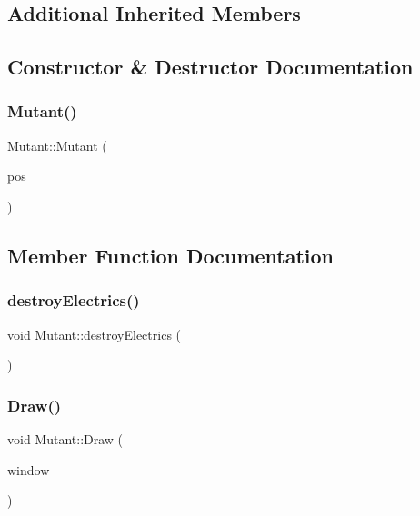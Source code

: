 \subsection*{Additional Inherited Members}


\subsection{Constructor \& Destructor Documentation}
\hypertarget{class_mutant_aa054e45e945caaef4ca7777fa32190c2}{}\label{class_mutant_aa054e45e945caaef4ca7777fa32190c2} 
\subsubsection{\texorpdfstring{Mutant()}{Mutant()}}
{\footnotesize\ttfamily Mutant\+::\+Mutant (\begin{DoxyParamCaption}\item[{\hyperlink{class_vector2_d}{Vector2D}}]{pos }\end{DoxyParamCaption})}



\subsection{Member Function Documentation}
\hypertarget{class_mutant_a5bbd6188efe9a18fa208bdaaf011ccdc}{}\label{class_mutant_a5bbd6188efe9a18fa208bdaaf011ccdc} 
\subsubsection{\texorpdfstring{destroy\+Electrics()}{destroyElectrics()}}
{\footnotesize\ttfamily void Mutant\+::destroy\+Electrics (\begin{DoxyParamCaption}{ }\end{DoxyParamCaption})}

\hypertarget{class_mutant_a024a5caac9b29a79a4a505d36cfd3122}{}\label{class_mutant_a024a5caac9b29a79a4a505d36cfd3122} 
\subsubsection{\texorpdfstring{Draw()}{Draw()}}
{\footnotesize\ttfamily void Mutant\+::\+Draw (\begin{DoxyParamCaption}\item[{sf\+::\+Render\+Window \&}]{window }\end{DoxyParamCaption})\hspace{0.3cm}{\ttfamily [virtual]}}




